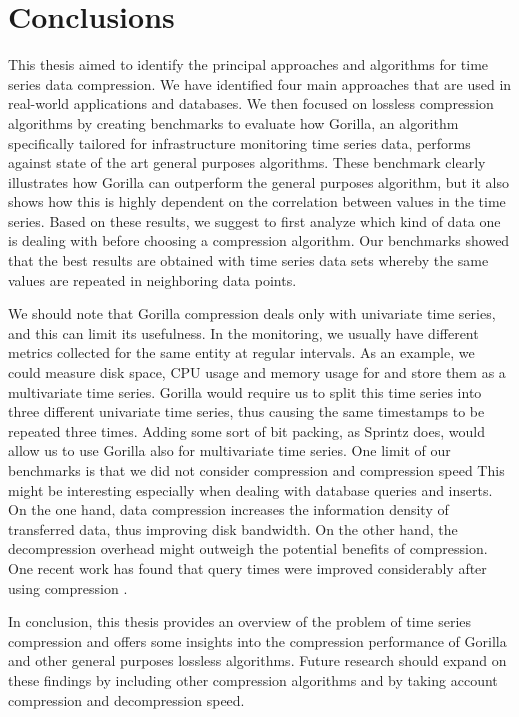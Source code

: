 \chapter*{Conclusions}
This thesis aimed to identify the principal approaches and algorithms for time series data compression.
We have identified four main approaches that are used in real-world applications and databases.
We then focused on lossless compression algorithms by creating benchmarks to evaluate how Gorilla,
an algorithm specifically tailored for infrastructure monitoring time series data, performs against
state of the art general purposes algorithms. 
These benchmark clearly illustrates how Gorilla can outperform the general purposes algorithm, but it
also shows how this is highly dependent on the correlation between values in the time series.
Based on these results, we suggest to first analyze which kind of data one is dealing with before choosing
a compression algorithm. Our benchmarks showed that the best results are obtained with time series data sets whereby the same values are repeated
in neighboring data points.

We should note that Gorilla compression deals only with univariate time series, and this can limit
its usefulness. In the monitoring, we usually have different metrics collected for the
same entity at regular intervals. As an example, we could measure disk space, CPU usage and memory usage
for and store them as a multivariate time series. Gorilla would require us to split this time series into
three different univariate time series, thus causing the same timestamps to be repeated three times.
Adding some sort of bit packing, as Sprintz does, would allow us to use Gorilla also for multivariate time series.
One limit of our benchmarks is that we did not consider compression and compression speed
This might be interesting especially when dealing with database queries and inserts. On the one hand,
data compression increases the information density of transferred data, thus
improving disk bandwidth. On the other hand, the decompression overhead might outweigh the potential
benefits of compression. One recent work has found that query times were improved
considerably after using compression \cite{burman2017implementing}.

In conclusion, this thesis provides an overview of the problem of time series compression and offers some insights
into the compression performance of Gorilla and other general purposes lossless algorithms. Future research should expand
on these findings by including other compression algorithms and by taking account compression and
decompression speed.

